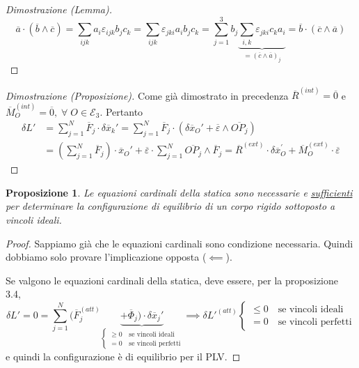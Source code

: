 \documentclass{book}
\theoremstyle{plain}
\theoremstyle{plain}
\theoremstyle{plain}
\theoremstyle{plain}
\theoremstyle{plain}
\newtheorem{prop}{Proposizione}[chapter]
\theoremstyle{definition}
\theoremstyle{remark}
\theoremstyle{definition}
\begin{document}
\begin{proof}[Dimostrazione (Lemma)]
    \begin{displaymath}
        \overline{a}\cdot(\overline{b}\wedge\overline{c})=\sum_{ijk}a_i\varepsilon_{ijk}b_jc_k=\sum_{ijk}\varepsilon_{jki}a_ib_jc_k=\sum_{j=1}^3b_j\underbrace{\sum_{i,k}\varepsilon_{jki}c_ka_i}_{=(\overline{c}\wedge\overline{a})_j}=\overline{b}\cdot(\overline{c}\wedge\overline{a})
    \end{displaymath}
\end{proof}

\begin{proof}[Dimostrazione (Proposizione)]
    Come già dimostrato in precedenza $\overline{R}^{(int)}=\overline{0}$ e $\overline{M}_O^{(int)}=\overline{0}, \;\forall \;O\in\mathcal{E}_3$. Pertanto
    \[
    \begin{split}
        \delta L'&=\sum_{j=1}^N\overline{F}_j\cdot\delta\overline{x}_k'=\sum_{j=1}^N\overline{F}_j\cdot(\delta\overline{x}_O'+\overline{\varepsilon}\wedge\overline{OP_j}) \\
        &=\left(\sum_{j=1}^N\overline{F}_j\right)\cdot\overline{x}_O'+\overline{\varepsilon}\cdot\sum_{j=1}^N\overline{OP_j}\wedge\overline{F}_j=\overline{R}^{(ext)} \cdot \delta \overline{x}_{O}^{\prime}+\overline{M}_{O}^{(ext)} \cdot \overline{\varepsilon}
    \end{split}
    \]
\end{proof}

\begin{prop}
    Le equazioni cardinali della statica sono necessarie e \underline{sufficienti} per determinare la configurazione di equilibrio di un corpo rigido sottoposto a vincoli ideali.
\end{prop}

\begin{proof}
    Sappiamo già che le equazioni cardinali sono condizione necessaria. Quindi dobbiamo solo provare l'implicazione opposta ($\impliedby$).

    \noindent Se valgono le equazioni cardinali della statica, deve essere, per la proposizione 3.4,
    \begin{displaymath}
        \delta L'=0=\sum_{j=1}^N(\overline{F}_j^{(att)}\underbrace{+\overline{\Phi}_j)\cdot\delta\overline{x}_j'}_{\begin{cases}
            \geq 0 \quad \text{se vincoli ideali} \\
            = 0 \quad \text{se vincoli perfetti}
        \end{cases}} \implies \delta L'^{(att)}
        \begin{cases}
            \leq 0 \quad \text{se vincoli ideali} \\
            = 0 \quad \text{se vincoli perfetti}
        \end{cases}
    \end{displaymath}
    e quindi la configurazione è di equilibrio per il PLV.
\end{proof}
\end{document}
